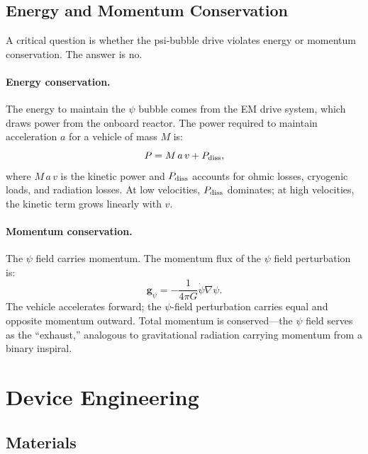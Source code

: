 \documentclass[twocolumn,prl,superscriptaddress,nofootinbib,longbibliography,floatfix]{revtex4-2}
\begin{document}
\subsection{Energy and Momentum Conservation}

A critical question is whether the psi-bubble drive violates energy or
momentum conservation.  The answer is no.

\paragraph{Energy conservation.}
The energy to maintain the $\psi$ bubble comes from the EM drive system,
which draws power from the onboard reactor.  The power required to
maintain acceleration $a$ for a vehicle of mass $M$ is:
\begin{equation}
P = M\,a\,v + P_{\rm diss},
\label{eq:power}
\end{equation}
where $M\,a\,v$ is the kinetic power and $P_{\rm diss}$ accounts for
ohmic losses, cryogenic loads, and radiation losses.  At low velocities,
$P_{\rm diss}$ dominates; at high velocities, the kinetic term grows
linearly with $v$.

\paragraph{Momentum conservation.}
The $\psi$ field carries momentum.  The momentum flux of the $\psi$
field perturbation is:
\begin{equation}
\mathbf{g}_\psi = -\frac{1}{4\pi G}\dot{\psi}\nabla\psi.
\label{eq:psi-momentum}
\end{equation}
The vehicle accelerates forward; the $\psi$-field perturbation carries
equal and opposite momentum outward.  Total momentum is conserved---the
$\psi$ field serves as the ``exhaust,'' analogous to gravitational
radiation carrying momentum from a binary inspiral.

\section{Device Engineering}\label{sec:engineering}

\subsection{Materials}
\end{document}
